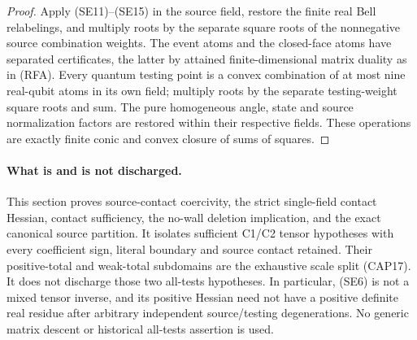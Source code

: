 \begin{proof}
Apply (SE11)--(SE15) in the source field, restore the finite real Bell
relabelings, and multiply roots by the separate square roots of the
nonnegative source combination weights.  The event atoms and the
closed-face atoms have separated certificates, the latter by attained
finite-dimensional matrix duality as in (RFA).  Every quantum testing
point is a convex combination of at most nine real-qubit atoms in its
own field; multiply roots by the separate testing-weight square roots
and sum.  The pure homogeneous angle, state and source normalization
factors are restored within their respective fields.  These operations
are exactly finite conic and convex closure of sums of squares.
\end{proof}

\paragraph{What is and is not discharged.}
This section proves source-contact coercivity, the strict single-field
contact Hessian, contact sufficiency, the no-wall deletion implication,
and the exact canonical source partition.  It isolates sufficient C1/C2
tensor hypotheses with every coefficient sign, literal boundary and
source contact retained.  Their positive-total and weak-total subdomains
are the exhaustive scale split (CAP17).  It does not discharge those
two all-tests hypotheses.  In particular, (SE6) is not a mixed tensor
inverse, and its positive Hessian need not have a positive definite
real residue after arbitrary independent source/testing degenerations.
No generic matrix descent or historical all-tests assertion is used.
